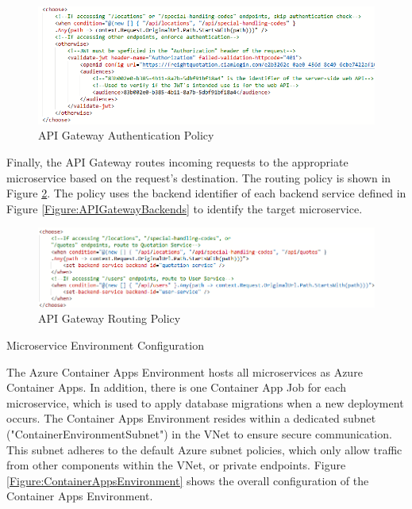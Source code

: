 \documentclass[12pt, reqno]{amsbook}
\makeatletter
\def\subsection{\@startsection{subsection}{2}%
      \z@{.5\linespacing\@plus.7\linespacing}{.25\linespacing}%
      {\normalfont\bfseries\flushleft}}
\theoremstyle{definition}
\theoremstyle{definition}
\numberwithin{section}{chapter}
\numberwithin{table}{chapter}
\numberwithin{figure}{chapter}
\makeatother
\begin{document}
\begin{figure}[H]
  \centering
  \includegraphics[width=0.9\linewidth]{images/APIGatewayConfigurationAuthentication.png}
  \caption{\label{Figure:APIGatewayConfigurationAuthentication}API Gateway Authentication Policy}
\end{figure}

Finally, the \ac{API} Gateway routes incoming requests to the appropriate microservice based on the request's destination. The routing policy is shown in Figure \ref{Figure:APIGatewayConfigurationRouting}. The policy uses the backend identifier of each backend service defined in Figure \ref{Figure:APIGatewayBackends} to identify the target microservice.

\begin{figure}[H]
  \centering
  \includegraphics[width=1\linewidth]{images/APIGatewayConfigurationRouting.png}
  \caption{\label{Figure:APIGatewayConfigurationRouting}API Gateway Routing Policy}
\end{figure}

\subsection{Microservice Environment Configuration}
\label{Subsection:Microservice_Environment_Configuration}

The Azure Container Apps Environment hosts all microservices as Azure Container Apps. In addition, there is one Container App Job for each microservice, which is used to apply database migrations when a new deployment occurs. The Container Apps Environment resides within a dedicated subnet ("ContainerEnvironmentSubnet") in the \ac{VNet} to ensure secure communication. This subnet adheres to the default Azure subnet policies, which only allow traffic from other components within the \ac{VNet}, or private endpoints. Figure \ref{Figure:ContainerAppsEnvironment} shows the overall configuration of the Container Apps Environment.
\end{document}
